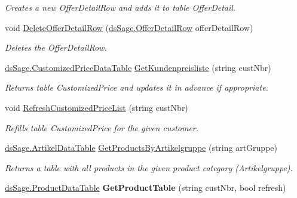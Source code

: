 \begin{DoxyCompactItemize}
\begin{DoxyCompactList}\small\item\em Creates a new Offer\+Detail\+Row and adds it to table Offer\+Detail. \end{DoxyCompactList}\item 
void \hyperlink{class_products_1_1_data_1_1_data_service_a1a4151330bcedfa82cd10ffad1e6cfe0}{Delete\+Offer\+Detail\+Row} (\hyperlink{class_products_1_1_data_1_1ds_sage_1_1_offer_detail_row}{ds\+Sage.\+Offer\+Detail\+Row} offer\+Detail\+Row)
\begin{DoxyCompactList}\small\item\em Deletes the Offer\+Detail\+Row. \end{DoxyCompactList}\item 
\hyperlink{class_products_1_1_data_1_1ds_sage_1_1_customized_price_data_table}{ds\+Sage.\+Customized\+Price\+Data\+Table} \hyperlink{class_products_1_1_data_1_1_data_service_aececaedfff243abbe3b5fdacbf316fde}{Get\+Kundenpreisliste} (string cust\+Nbr)
\begin{DoxyCompactList}\small\item\em Returns table Customized\+Price and updates it in advance if appropriate. \end{DoxyCompactList}\item 
void \hyperlink{class_products_1_1_data_1_1_data_service_a7d11c66081ef5aa8325a73148234198d}{Refresh\+Customized\+Price\+List} (string cust\+Nbr)
\begin{DoxyCompactList}\small\item\em Refills table Customized\+Price for the given customer. \end{DoxyCompactList}\item 
\hyperlink{class_products_1_1_data_1_1ds_sage_1_1_artikel_data_table}{ds\+Sage.\+Artikel\+Data\+Table} \hyperlink{class_products_1_1_data_1_1_data_service_a997ac97b00edc186bc681bee743051d9}{Get\+Products\+By\+Artikelgruppe} (string art\+Gruppe)
\begin{DoxyCompactList}\small\item\em Returns a table with all products in the given product category (Artikelgruppe). \end{DoxyCompactList}\item 
\hyperlink{class_products_1_1_data_1_1ds_sage_1_1_product_data_table}{ds\+Sage.\+Product\+Data\+Table} {\bfseries Get\+Product\+Table} (string cust\+Nbr, bool refresh)\hypertarget{class_products_1_1_data_1_1_data_service_a57fc55195ac10ef5e6623f9083930114}{}\label{class_products_1_1_data_1_1_data_service_a57fc55195ac10ef5e6623f9083930114}


\end{DoxyCompactItemize}
